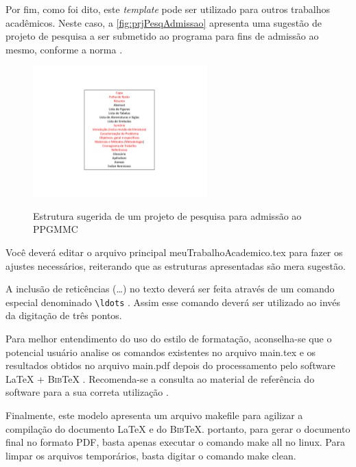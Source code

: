 \begin{apendicesenv}
Por fim, como foi dito, este  \emph{template} pode ser utilizado para outros trabalhos acadêmicos. Neste caso, a \autoref{fig:prjPesqAdmissao} apresenta uma sugestão de projeto de pesquisa a ser submetido ao programa para fins de admissão ao mesmo, conforme a norma .

\begin{figure}[!htb]
	\centering
	\caption{Estrutura sugerida de um projeto de pesquisa para admissão ao PPGMMC}
	\includegraphics[width=0.6\textwidth]{./04-figuras/prjPesqAdmissao}
	\label{fig:prjPesqAdmissao}
\end{figure}

Você deverá editar o arquivo principal {\ttfamily meuTrabalhoAcademico.tex} para fazer os ajustes necessários, reiterando que as estruturas apresentadas são mera sugestão. 

A inclusão de reticências (\ldots) no texto deverá ser feita através de um comando especial denominado \verb|\ldots| \cite{LaTeX2014}. Assim esse comando deverá ser utilizado ao invés da digitação de três pontos.

Para melhor entendimento do uso do estilo de formatação, aconselha-se que o potencial usuário analise os comandos existentes no arquivo {\ttfamily main.tex} e os resultados obtidos no arquivo {\ttfamily main.pdf} depois do processamento pelo software \LaTeX{} + \textsc{Bib}\TeX{} \cite{LaTeX2014,BibTeX2014}.
Recomenda-se a consulta ao material de referência do software para a sua correta utilização \cite{Lamport1986,Buerger1989,Kopka2003,Mittelbach2004}.

Finalmente, este modelo apresenta um arquivo {\ttfamily makefile} para agilizar a compilação do documento \LaTeX{} e do \textsc{Bib}\TeX{}. portanto, para gerar o documento final no formato PDF, basta apenas executar o comando {\ttfamily make all} no linux. Para limpar os arquivos temporários, basta digitar o comando {\ttfamily make clean}.


\end{apendicesenv}
